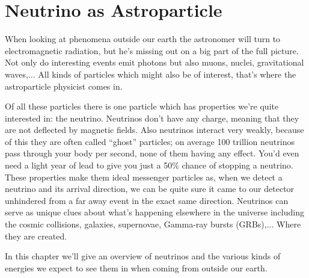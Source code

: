 \chapter{Neutrino as Astroparticle}
\label{chap:neutrino}
When looking at phenomena outside our earth the astronomer will turn to
electromagnetic radiation, but he's missing out on a big part of the full
picture. Not only do interesting events emit photons but also muons, nuclei,
gravitational waves,... All kinds of particles which might also be of interest,
that's where the astroparticle physicist comes in.

Of all these particles there is one particle which has properties we're quite
interested in: the neutrino.  Neutrinos don't have any charge, meaning that
they are not deflected by magnetic fields. Also neutrinos interact very weakly,
because of this they are often called “ghost” particles; on average 100
trillion neutrinos pass through your body per second, none of them having any
effect.  You'd even need a light year of lead to give you just a 50\% chance of
stopping a neutrino.
These properties make them ideal messenger particles as, when we detect a neutrino
and its arrival direction, we can be quite sure it came to our detector unhindered
from a far away event in the exact same direction.
Neutrinos can serve as unique clues
about what’s happening elsewhere in the universe including the cosmic
collisions, galaxies, supernovae, Gamma-ray bursts (GRBs),... Where they are created.

In this chapter we'll give an overview of neutrinos and the various kinds of energies we expect
to see them in when coming from outside our earth.

